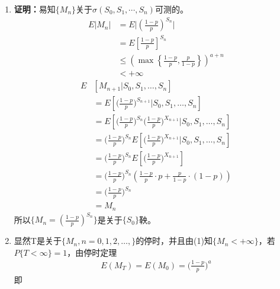 \begin{enumerate}
	      \begin{enumerate}[\bfseries (1)]
		      \item \textbf{证明：}易知\(\{M_n\}\)关于\(\sigma(S_0,S_1,\cdots,S_n)\)可测的。
		            \begin{align*}
			            E|M_n|
			             & =E\bigg|\left(\frac{1-p}{p}\right)^{S_n}\bigg|                             \\
			             & =E\left[\frac{1-p}{p}\right]^{S_n}                                         \\
			             & \leqslant\left(\max\left\{\frac{1-p}{p},\frac{p}{1-p}\right\}\right)^{a+n} \\
			             & <+\infty
		            \end{align*}
		            \begin{align*}
			            E & [M_{n+1}|S_0,S_1,\ldots,S_n]                                                      \\
			              & =E\left[\bigg(\frac{1-p}{p}\bigg)^{S_{n+1}}|S_0,S_1,\ldots,S_n\right]             \\
			              & =E\left[\bigg(\frac{1-p}{p}\bigg)^{S_n}\bigg(\frac{1-p}{p}\bigg)^{X_{n+1}}
			            |S_0,S_1,\ldots,S_n\right]                                                            \\
			              & =\bigg(\frac{1-p}{p}\bigg)^{S_n}
			            E\left[\bigg(\frac{1-p}{p}\bigg)^{X_{n+1}}|S_0,S_1,\ldots,S_n\right]                  \\
			              & =\bigg(\frac{1-p}{p}\bigg)^{S_n}E\left[\bigg(\frac{1-p}{p}\bigg)^{X_{n+1}}\right] \\
			              & =\bigg(\frac{1-p}{p}\bigg)^{S_n}(\frac{1-p}{p}\cdot p+\frac{p}{1-p}\cdot (1-p))   \\
			              & =\bigg(\frac{1-p}{p}\bigg)^{S_n}                                                  \\
			              & =M_n
		            \end{align*}
		            所以\(\{M_n=\left(\frac{1-p}{p}\right)^{S_n}\}\)是关于\(\{S_0\}\)鞅。
		      \item 显然T是关于\(\{M_n,n=0,1,2,\ldots,\}\)的停时，并且由(1)知\(\{M_n<+\infty\}\)，若\(P\{T<\infty\}=1\)，由停时定理
		            \begin{align*}
			            E(M_T)=E(M_0)=\bigg(\frac{1-p}{p}\bigg)^a
		            \end{align*}
		            即
		            \begin{align*}

\end{align*}
\end{enumerate}
\end{enumerate}
